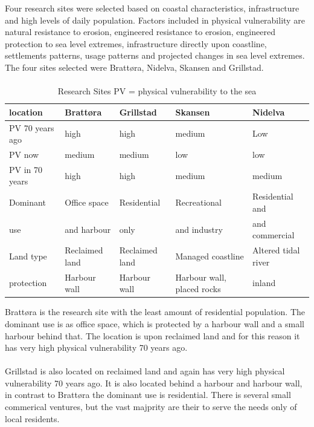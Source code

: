 Four research sites were selected based on coastal characteristics, infrastructure and high levels of daily population. Factors included in physical vulnerability are natural resistance to erosion, engineered resistance to erosion, engineered protection to sea level extremes, infrastructure directly upon coastline, settlements patterns, usage patterns and projected changes in sea level extremes. The four sites selected were Brattøra, Nidelva, Skansen and Grillstad. 


\paragraph{}
\begin{table}[!ht]
    \centering
    \begin{tabular}{|l|l|l|l|l|}
    \hline
        location & Brattøra & Grillstad & Skansen  & Nidelva \\ \hline
        PV 70 years ago & high & high & medium & Low \\ \hline
        PV now &  medium &  medium &  low &  low \\ \hline
        PV in 70 years &  high &  high &  medium &  medium \\ \hline
        Dominant & Office space  & Residential & Recreational  & Residential and \\ \newline
        use & and harbour &  only   &  and industry & and commercial  \\ \hline
        Land type & Reclaimed land & Reclaimed land & Managed coastline  & Altered tidal river \\ \hline
        protection & Harbour wall & Harbour wall & Harbour wall, placed rocks & inland \\ \hline
    \end{tabular}
    \caption{Research Sites PV = physical vulnerability to the sea}
    \label{table:research-sites}
\end{table}

Brattøra is the research site with the least amount of residential population. The dominant use is as office space, which is protected by a harbour wall and a small harbour behind that. The location is upon reclaimed land and for this reason it has very high physical vulnerability 70 years ago. 
\paragraph{}
Grillstad is also located on reclaimed land and again has very high physical vulnerability 70 years ago. It is also located behind a harbour and harbour wall, in contrast to  Brattøra the dominant use is residential. There is several small commerical ventures, but the vast majprity are their to serve the needs only of local residents. 
